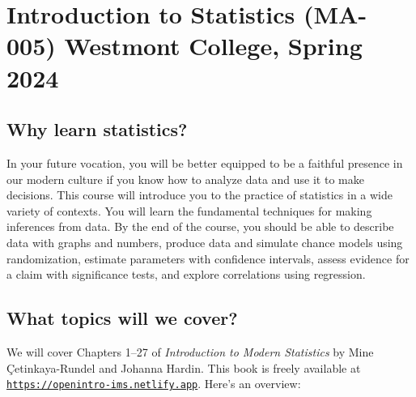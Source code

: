 \documentclass[
  twoside]{article}
\author{}
\date{\vspace{-2.5em}}
\begin{document}
\hypertarget{introduction-to-statistics-ma-005-westmont-college-spring-2024}{%
\section{Introduction to Statistics (MA-005) Westmont College, Spring
2024}\label{introduction-to-statistics-ma-005-westmont-college-spring-2024}}

\hypertarget{why-learn-statistics}{%
\subsection{Why learn statistics?}\label{why-learn-statistics}}

In your future vocation, you will be better equipped to be a faithful
presence in our modern culture if you know how to analyze data and use
it to make decisions. This course will introduce you to the practice of
statistics in a wide variety of contexts. You will learn the fundamental
techniques for making inferences from data. By the end of the course,
you should be able to describe data with graphs and numbers, produce
data and simulate chance models using randomization, estimate parameters
with confidence intervals, assess evidence for a claim with significance
tests, and explore correlations using regression.

\hypertarget{what-topics-will-we-cover}{%
\subsection{What topics will we
cover?}\label{what-topics-will-we-cover}}

We will cover Chapters 1--27 of \emph{Introduction to Modern Statistics}
by Mine Çetinkaya-Rundel and Johanna Hardin. This book is freely
available at
\href{https://openintro-ims.netlify.app/}{\texttt{https://openintro-ims.netlify.app}}.
Here's an overview:
\end{document}
